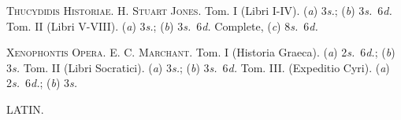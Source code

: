 \documentclass[12pt,oneside]{book}[2021/10/04]
\newenvironment{advlist}{
  \begin{description}[leftmargin=1em, parsep=0.2ex, listparindent=1em,]
}{\end{description}}
\newcommand{\¬}{\hphantom{0}}
\begin{document}
\begin{advlist}
\item[\mdseries\textsc{Thucydidis Historiae.}] \textsc{H.
Stuart Jones.} Tom. I (Libri
I-IV). (\textit{a}) 3\textit{s.}; (\textit{b}) 3\textit{s.}\ 6\textit{d.} Tom.
II (Libri V-VIII). (\textit{a}) 3\textit{s.}; (\textit{b})
3\textit{s.}\ 6\textit{d.} Complete, (\textit{c}) 8\textit{s.}\ 6\textit{d.}

\item[\mdseries\textsc{Xenophontis Opera.}] \textsc{E. C.
Marchant.} Tom. I (Historia
Graeca). (\textit{a}) 2\textit{s.}\ 6\textit{d.}; (\textit{b}) 3\textit{s.} Tom.
II (Libri Socratici). (\textit{a}) 3\textit{s.}; (\textit{b})
3\textit{s.}\ 6\textit{d.} Tom. III. (Expeditio
Cyri). (\textit{a}) 2\textit{s.}\ 6\textit{d.}; (\textit{b}) 3\textit{s.}
\end{advlist}
\begin{center}
LATIN.
\end{center}
\end{document}
